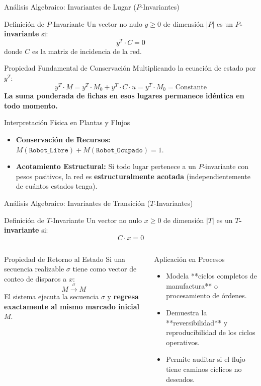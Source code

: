 \documentclass[10pt, aspectratio=169]{beamer}
\begin{document}
\begin{frame}{Análisis Algebraico: Invariantes de Lugar ($P$-Invariantes)}
	\begin{block}{Definición de $P$-Invariante}
		Un vector no nulo $y \ge 0$ de dimensión $|P|$ es un \textbf{$P$-invariante} si:
		\[ y^T \cdot C = 0 \]
		donde $C$ es la matriz de incidencia de la red.
	\end{block}

	\begin{alertblock}{Propiedad Fundamental de Conservación}
		Multiplicando la ecuación de estado por $y^T$:
		\[ y^T \cdot M = y^T \cdot M_0 + y^T \cdot C \cdot u = y^T \cdot M_0 = \text{Constante} \]
		\textbf{La suma ponderada de fichas en esos lugares permanece idéntica en todo momento.}
	\end{alertblock}

	\begin{exampleblock}{Interpretación Física en Plantas y Flujos}
		\begin{itemize}
			\item \textbf{Conservación de Recursos:} $M(\texttt{Robot\_Libre}) + M(\texttt{Robot\_Ocupado}) = 1$.
			\item \textbf{Acotamiento Estructural:} Si todo lugar pertenece a un $P$-invariante con pesos positivos, la red es \textbf{estructuralmente acotada} (independientemente de cuántos estados tenga).
		\end{itemize}
	\end{exampleblock}
\end{frame}

\begin{frame}{Análisis Algebraico: Invariantes de Transición ($T$-Invariantes)}
	\begin{block}{Definición de $T$-Invariante}
		Un vector no nulo $x \ge 0$ de dimensión $|T|$ es un \textbf{$T$-invariante} si:
		\[ C \cdot x = 0 \]
	\end{block}

	\begin{columns}
		\begin{block}{Propiedad de Retorno al Estado}
			Si una secuencia realizable $\sigma$ tiene como vector de conteo de disparos a $x$:
			\[ M \xrightarrow{\;\sigma\;} M \]
			El sistema ejecuta la secuencia $\sigma$ y \textbf{regresa exactamente al mismo marcado inicial $M$}.
		\end{block}

		\begin{exampleblock}{Aplicación en Procesos}
			\begin{itemize}
				\item Modela **ciclos completos de manufactura** o procesamiento de órdenes.
				\item Demuestra la **reversibilidad** y reproducibilidad de los ciclos operativos.
				\item Permite auditar si el flujo tiene caminos cíclicos no deseados.
			\end{itemize}
		\end{exampleblock}
	\end{columns}
\end{frame}
\end{document}
